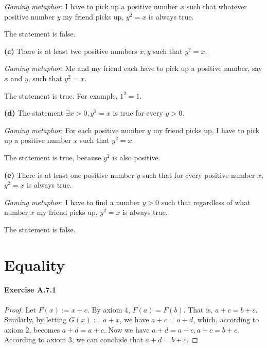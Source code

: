 \emph{Gaming metaphor}: I have to pick up a positive number $x$ such that whatever positive number $y$ 
my friend picks up, $y^2=x$ is always true.

The statement is false.

\textbf{(c)} There is at least two positive numbers $x,y$ such that $y^2=x$.

\emph{Gaming metaphor}: Me and my friend each have to pick up a positive number, say $x$ and $y$, such 
that $y^2=x$.

The statement is true. For example, $1^2=1$.

\textbf{(d)} The statement $\exists x > 0, y^2=x$ is true for every $y>0$.

\emph{Gaming metaphor}: For each positive number $y$ my friend picks up, I have to pick up a positive 
number $x$ such that $y^2=x$.

The statement is true, because $y^2$ is also positive.

\textbf{(e)} There is at least one positive number $y$ such that for every positive number $x$, $y^2=x$ 
is always true.

\emph{Gaming metaphor}: I have to find a number $y>0$ such that regardless of what number $x$ my friend 
picks up, $y^2=x$ is always true.

The statement is false.

\section{Equality}
\paragraph{Exercise A.7.1} \label{exercisea.7.1}
\begin{proof}
Let $F(x) := x+c$. By axiom 4, $F(a)=F(b)$. That is, $a+c=b+c$. Similarly, by letting $G(x) := a+x$, 
we have $a+c=a+d$, which, according to axiom 2, becomes $a+d=a+c$. Now we have $a+d=a+c, a+c=b+c$. 
According to axiom 3, we can conclude that $a+d=b+c$.
\end{proof}